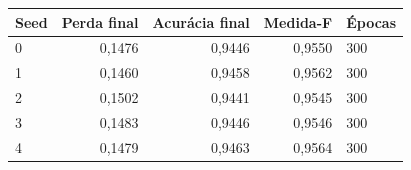 \begin{tabular}{lrrrl}
\toprule
Seed & Perda final & Acurácia final & Medida-F & Épocas \\
\midrule
0 & 0,1476 & 0,9446 & 0,9550 & 300 \\
1 & 0,1460 & 0,9458 & 0,9562 & 300 \\
2 & 0,1502 & 0,9441 & 0,9545 & 300 \\
3 & 0,1483 & 0,9446 & 0,9546 & 300 \\
4 & 0,1479 & 0,9463 & 0,9564 & 300 \\
\bottomrule
\end{tabular}
